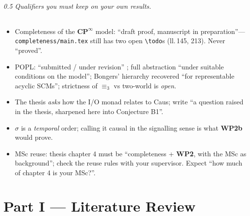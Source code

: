 \documentclass[11pt,a4paper]{article}
\newif\ifskeletonnotes
\newcommand{\sknote}[1]{\ifskeletonnotes{\small\color{blue!60!black}\textit{[#1]}}\fi}
\newcommand{\skfill}[1]{\ifskeletonnotes{\color{orange!80!black}[FILL: #1]}\fi}
\newcommand{\WP}[1]{\textbf{WP#1}}
\newcommand{\CPinf}{\mathbf{CP}^{\infty}}
\begin{document}
\paragraph{0.5 Qualifiers you must keep on your own results.}
\begin{itemize}[nosep]
\item Completeness of the $\CPinf$ model: ``draft proof, manuscript in preparation''---\texttt{completeness/main.tex} still has two open \texttt{\textbackslash todo}s (ll.\,145, 213). Never ``proved''.
\item POPL: ``submitted / under revision'' \skfill{exact status}; full abstraction ``under suitable conditions on the model''; Bongers' hierarchy recovered ``for representable acyclic SCMs''; strictness of $\equiv_3$ vs two-world is \emph{open}.
\item The thesis \emph{asks} how the I/O monad relates to Caus; write ``a question raised in the thesis, sharpened here into Conjecture B1''.
\item $\sigma$ is a \emph{temporal} order; calling it causal in the signalling sense is what \WP{2b} would prove.
\item MSc reuse: thesis chapter 4 must be ``completeness + \WP{2}, with the MSc as background''; check the reuse rules with your supervisor. Expect ``how much of chapter 4 is your MSc?''.
\end{itemize}
\fi

\part*{Part I --- Literature Review}
\sknote{Target $\approx$3500 words. Section budgets below.}
\end{document}
